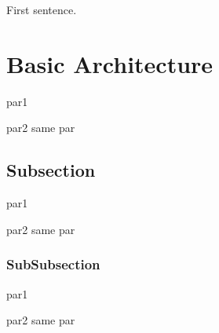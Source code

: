 First sentence.\hypertarget{index_intro_sec}{}\section{Basic Architecture}\label{index_intro_sec}
par1

par2 same par\hypertarget{invstDoku_sub1}{}\subsection{Subsection       }\label{invstDoku_sub1}
par1

par2 same par\hypertarget{invstDoku_subsub1}{}\subsubsection{Sub\+Subsection}\label{invstDoku_subsub1}
par1

par2 same par 